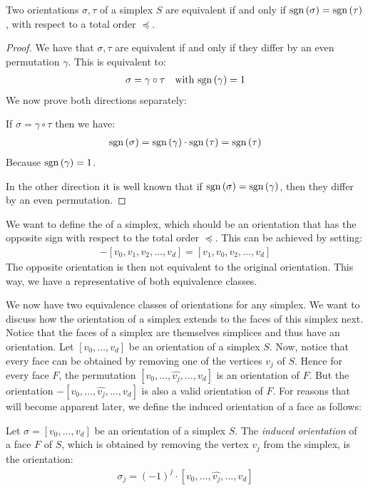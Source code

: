 \begin{lemma}
	Two orientations $\sigma, \tau$ of a simplex $S$ are equivalent if and only if $\operatorname{sgn}\left(\sigma\right) = \operatorname{sgn}\left(\tau\right)$, with respect to a total order $\preceq$.
\end{lemma}
\begin{proof}
	We have that $\sigma, \tau$ are equivalent if and only if they differ by an even permutation $\gamma$. This is equivalent to:
	\begin{align*}
		\sigma = \gamma \circ \tau \quad \text{with $\operatorname{sgn}\left(\gamma\right)=1$}
	\end{align*}
	We now prove both directions separately:

	If $\sigma = \gamma \circ \tau$ then we have:
	\begin{align*}
		\operatorname{sgn}\left(\sigma\right)= \operatorname{sgn}\left(\gamma\right) \cdot \operatorname{sgn}\left(\tau\right) = \operatorname{sgn}\left(\tau\right)
	\end{align*}
	Because $\operatorname{sgn}\left(\gamma\right)=1$.

	In the other direction it is well known that if $\operatorname{sgn}\left(\sigma\right)= \operatorname{sgn}\left(\gamma\right)$, then they differ by an even permutation.
\end{proof}

We want to define the  of a simplex, which should be an orientation that has the opposite sign with respect to the total order $\preceq$. This can be achieved by setting:
\begin{align*}
	- [v_0, v_1, v_2, \dots, v_d] = [v_1, v_0, v_2, \dots, v_d]
\end{align*}
The opposite orientation is then not equivalent to the original orientation. This way, we have a representative of both equivalence classes.

We now have two equivalence classes of orientations for any simplex. We want to discuss how the orientation of a simplex extends to the faces of this simplex next. Notice that the faces of a simplex are themselves simplices and thus have an orientation. Let $[v_0, \dots, v_{d}]$ be an orientation of a simplex $S$. Now, notice that every face can be obtained by removing one of the vertices $v_j$ of $S$. Hence for every face $F$, the permutation $[v_0, \dots, \hat{v_j}, \dots, v_{d}]$ is an orientation of $F$. But the orientation $- [v_0, \dots, \hat{v_j}, \dots, v_{d}]$ is also a valid orientation of $F$. For reasons that will become apparent later, we define the induced orientation of a face as follows:

\begin{definition}
	Let $\sigma = [v_0, \dots, v_{d}]$ be an orientation of a simplex $S$. The \emph{induced orientation} of a face $F$ of $S$, which is obtained by removing the vertex $v_j$ from the simplex, is the orientation:
	\begin{align*}
		\sigma_j = {(-1)}^j \cdot [v_0, \dots, \hat{v_j}, \dots, v_{d}]
	\end{align*}
\end{definition}

